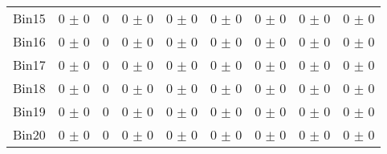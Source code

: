 \begin{tabular}{@{\extracolsep{4pt}}lcccccccc@{}}
     Bin15 & 0 $\pm$ 0 & 0 & 0 $\pm$ 0 & 0 $\pm$ 0 & 0 $\pm$ 0 & 0 $\pm$ 0 & 0 $\pm$ 0 & 0 $\pm$ 0 \\ 
     Bin16 & 0 $\pm$ 0 & 0 & 0 $\pm$ 0 & 0 $\pm$ 0 & 0 $\pm$ 0 & 0 $\pm$ 0 & 0 $\pm$ 0 & 0 $\pm$ 0 \\ 
     Bin17 & 0 $\pm$ 0 & 0 & 0 $\pm$ 0 & 0 $\pm$ 0 & 0 $\pm$ 0 & 0 $\pm$ 0 & 0 $\pm$ 0 & 0 $\pm$ 0 \\ 
     Bin18 & 0 $\pm$ 0 & 0 & 0 $\pm$ 0 & 0 $\pm$ 0 & 0 $\pm$ 0 & 0 $\pm$ 0 & 0 $\pm$ 0 & 0 $\pm$ 0 \\ 
     Bin19 & 0 $\pm$ 0 & 0 & 0 $\pm$ 0 & 0 $\pm$ 0 & 0 $\pm$ 0 & 0 $\pm$ 0 & 0 $\pm$ 0 & 0 $\pm$ 0 \\ 
     Bin20 & 0 $\pm$ 0 & 0 & 0 $\pm$ 0 & 0 $\pm$ 0 & 0 $\pm$ 0 & 0 $\pm$ 0 & 0 $\pm$ 0 & 0 $\pm$ 0 \\ 
\hline\hline
  \end{tabular}
